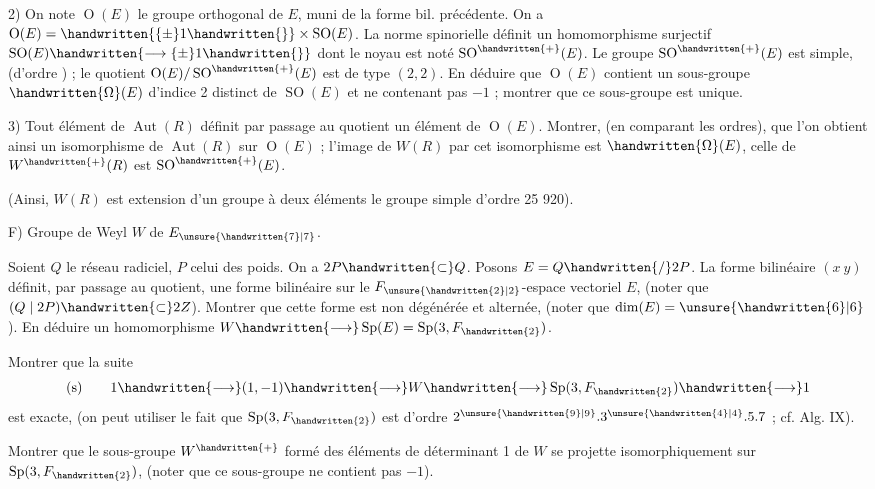 2) On note $\operatorname{O}(E)$ le groupe orthogonal de $E$, muni de la forme bil. précédente. On a $\operatorname{O}(E)=\handwritten{\{\pm}1\handwritten{\}}\times\operatorname{SO}(E)$. La norme spinorielle définit un homomorphisme surjectif $\operatorname{SO}(E)\handwritten{\longrightarrow\{\pm}1\handwritten{\}}$ dont le noyau est noté $\operatorname{SO}^{\handwritten{+}}(E)$. Le groupe $\operatorname{SO}^{\handwritten{+}}(E)$ est simple, (d'ordre ) ; le quotient $\operatorname{O}(E)/\operatorname{SO}^{\handwritten{+}}(E)$ est de type $(2,2)$. En déduire que $\operatorname{O}(E)$ contient un sous-groupe $\handwritten{\Omega}(E)$ d'indice 2 distinct de $\operatorname{SO}(E)$ et ne contenant pas $-1$ ; montrer que ce sous-groupe est unique.

3) Tout élément de $\operatorname{Aut}(R)$ définit par passage au quotient un élément de $\operatorname{O}(E)$. Montrer, (en comparant les ordres), que l'on obtient ainsi un isomorphisme de $\operatorname{Aut}(R)$ sur $\operatorname{O}(E)$ ; l'image de $W(R)$ par cet isomorphisme est $\handwritten{\Omega}(E)$, celle de $W^{\handwritten{+}}(R)$ est $\operatorname{SO}^{\handwritten{+}}(E)$.

(Ainsi, $W(R)$ est extension d'un groupe à deux éléments  le groupe simple d'ordre 25 920).

F) Groupe de Weyl $W$ de $E_{\unsure{\handwritten{7}|7}}$.

Soient $Q$ le réseau radiciel, $P$ celui des poids. On a $2P\handwritten{\subset}Q$. Posons $E=Q\handwritten{/}2P$. La forme bilinéaire $(x\ y)$ définit, par passage au quotient, une forme bilinéaire sur le $F_{\unsure{\handwritten{2}|2}}$-espace vectoriel $E$, (noter que $(Q\mid 2P)\handwritten{\subset}2Z$). Montrer que cette forme est non dégénérée et alternée, (noter que $\dim(E)=\unsure{\handwritten{6}|6}$). En déduire un homomorphisme $W\handwritten{\longrightarrow}\operatorname{Sp}(E)=\operatorname{Sp}(3,F_{\handwritten{2}})$.

Montrer que la suite
\[
\text{(s)}\qquad 1\handwritten{\longrightarrow}(1,-1)\handwritten{\longrightarrow}W\handwritten{\longrightarrow}\operatorname{Sp}(3,F_{\handwritten{2}})\handwritten{\longrightarrow}1
\]
est exacte, (on peut utiliser le fait que $\operatorname{Sp}(3,F_{\handwritten{2}})$ est d'ordre $2^{\unsure{\handwritten{9}|9}}.3^{\unsure{\handwritten{4}|4}}.5.7$ ; cf. Alg. IX).

Montrer que le sous-groupe $W^{\handwritten{+}}$ formé des éléments de déterminant 1 de $W$ se projette isomorphiquement sur $\operatorname{Sp}(3,F_{\handwritten{2}})$, (noter que ce sous-groupe ne contient pas $-1$).

